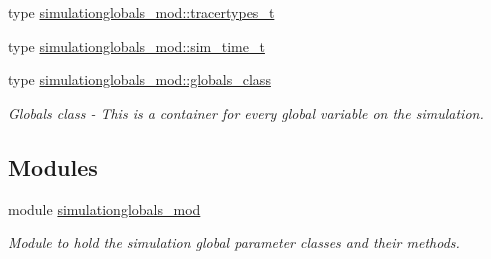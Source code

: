 \begin{DoxyCompactItemize}
type \mbox{\hyperlink{structsimulationglobals__mod_1_1tracertypes__t}{simulationglobals\+\_\+mod\+::tracertypes\+\_\+t}}
\item 
type \mbox{\hyperlink{structsimulationglobals__mod_1_1sim__time__t}{simulationglobals\+\_\+mod\+::sim\+\_\+time\+\_\+t}}
\item 
type \mbox{\hyperlink{structsimulationglobals__mod_1_1globals__class}{simulationglobals\+\_\+mod\+::globals\+\_\+class}}
\begin{DoxyCompactList}\small\item\em Globals class -\/ This is a container for every global variable on the simulation. \end{DoxyCompactList}\end{DoxyCompactItemize}
\subsection*{Modules}
\begin{DoxyCompactItemize}
\item 
module \mbox{\hyperlink{namespacesimulationglobals__mod}{simulationglobals\+\_\+mod}}
\begin{DoxyCompactList}\small\item\em Module to hold the simulation global parameter classes and their methods. \end{DoxyCompactList}\end{DoxyCompactItemize}
